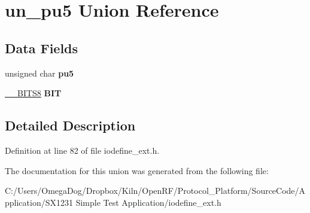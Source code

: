 \hypertarget{unionun__pu5}{\section{un\-\_\-pu5 Union Reference}
\label{unionun__pu5}
}
\subsection*{Data Fields}
\begin{DoxyCompactItemize}
\item 
\hypertarget{unionun__pu5_afd49c46b9d8ef2e8f716bfdb43cde241}{unsigned char {\bfseries pu5}}\label{unionun__pu5_afd49c46b9d8ef2e8f716bfdb43cde241}

\item 
\hypertarget{unionun__pu5_ac097ca5789aac11c4a8a570ab05d908d}{\hyperlink{struct_____b_i_t_s8}{\-\_\-\-\_\-\-B\-I\-T\-S8} {\bfseries B\-I\-T}}\label{unionun__pu5_ac097ca5789aac11c4a8a570ab05d908d}

\end{DoxyCompactItemize}


\subsection{Detailed Description}


Definition at line 82 of file iodefine\-\_\-ext.\-h.



The documentation for this union was generated from the following file\-:\begin{DoxyCompactItemize}
\item 
C\-:/\-Users/\-Omega\-Dog/\-Dropbox/\-Kiln/\-Open\-R\-F/\-Protocol\-\_\-\-Platform/\-Source\-Code/\-Application/\-S\-X1231 Simple Test Application/iodefine\-\_\-ext.\-h\end{DoxyCompactItemize}
